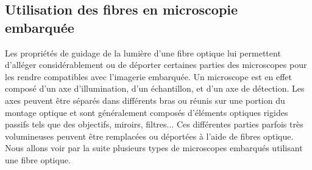 

\subsection{Utilisation des fibres en microscopie embarquée}


Les propriétés de guidage de la lumière d'une fibre optique lui permettent d'alléger considérablement ou de déporter certaines parties des microscopes pour les rendre compatibles avec l'imagerie embarquée. Un microscope est en effet composé d'un axe d'illumination, d'un échantillon, et d'un axe de détection. Les axes peuvent être séparés dans différents bras ou réunis sur une portion du montage optique et sont généralement composés d'éléments optiques rigides passifs tels que des objectifs, miroirs, filtres... Ces différentes parties parfois très volumineuses peuvent être remplacées ou déportées à l'aide de fibres optique. Nous allons voir par la suite plusieurs types de microscopes embarqués utilisant une fibre optique.

